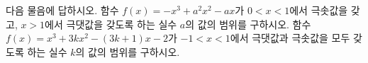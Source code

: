 다음 물음에 답하시오.
 함수 $f(x)=-x^3+a^2x^2-ax$가 $0<x<1$에서 극솟값을 갖고, $x>1$에서 극댓값을 갖도록 하는 실수 $a$의 값의 범위를 구하시오.
 함수 $f(x)=x^3+3kx^2-(3k+1)x-2$가 $-1<x<1$에서 극댓값과 극솟값을 모두 갖도록 하는 실수 $k$의 값의 범위를 구하시오.
